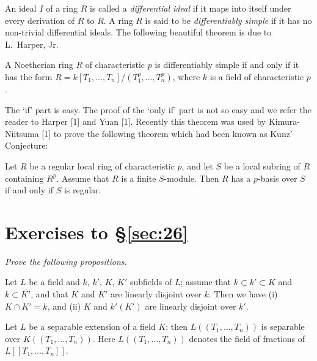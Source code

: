 \begin{remark}
An ideal $I$ of a ring $R$ is called a \emph{differential ideal} if it maps into itself under
every derivation of $R$ to $R$. A ring $R$ is said to be \emph{differentiably simple} if it has
no non-trivial differential ideals. The following beautiful theorem is due to
L.~Harper, Jr.

\begin{theorem*}
A Noetherian ring $R$ of characteristic $p$ is differentiably simple if and only if
it has the form $R = k[T_1, \ldots, T_n]/(T_1^p, \ldots, T_n^p)$, where $k$ is a field of
characteristic $p$.
\end{theorem*}

The `if' part is easy. The proof of the `only if' part is not so easy and we refer
the reader to Harper [1] and Yuan [1]. Recently this theorem was used by
Kimura-Niitsuma [1] to prove the following theorem which had been known as
Kunz' Conjecture:

\begin{theorem*}
Let $R$ be a regular local ring of characteristic $p$, and let $S$ be a local subring
of $R$ containing $R^p$. Assume that $R$ is a finite $S$-module. Then $R$ has a
$p$-basis over $S$ if and only if $S$ is regular.
\end{theorem*}
\end{remark}

\section*{Exercises to \S\ref{sec:26}}
\emph{Prove the following propositions.}

\begin{exercise}\label{ex:26.1-ex}
Let $L$ be a field and $k$, $k'$, $K$, $K'$ subfields of $L$; assume that $k \subset k' \subset K$
and $k \subset K'$, and that $K$ and $K'$ are linearly disjoint over $k$. Then we have
(i) $K \cap K' = k$, and (ii) $K$ and $k'(K')$ are linearly disjoint over $k'$.
\end{exercise}

\begin{exercise}\label{ex:26.2-ex}
Let $L$ be a separable extension of a field $K$; then $L((T_1, \ldots, T_n))$ is separable
over $K((T_1, \ldots, T_n))$. Here $L((T_1, \ldots, T_n))$ denotes the field of fractions of
$L[[T_1, \ldots, T_n]]$.
\end{exercise}
